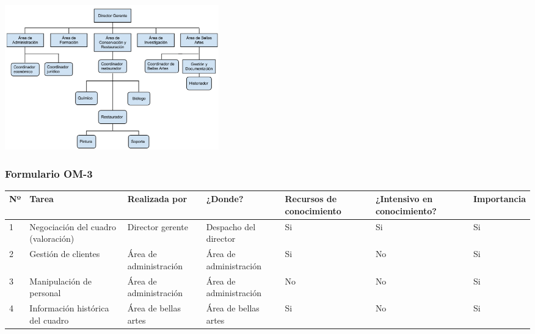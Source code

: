 \documentclass[a4paper,11pt]{article}
\begin{document}
\begin{center}
\begin{tabular}{| p{2.5cm} | p{9cm} |}
					\hline
				\end{tabular}\\
				\newpage
				\includegraphics[width=350px]{organigrama.png} \\
			\end{center}
			\newpage
			\begin{landscape}
			\subsubsection{Formulario OM-3}
			\begin{center}
				\begin{tabular}{| l | p{4cm} | p{2.8cm} | p{2cm} | p{2cm} | p{3cm} |
				p{2.2cm} |}
					\hline
					\textbf{Nº} & \textbf{Tarea} & \textbf{Realizada por} & \textbf{¿Donde?} & \textbf{Recursos de conocimiento} &
					\textbf{¿Intensivo en conocimiento?} & \textbf{Importancia}\\
					\hline
					1 & Negociación del cuadro (valoración) & Director gerente & Despacho del
					director & Si & Si & Si\\
					\hline
					2 & Gestión de clientes & Área de administración & Área de administración
					& Si & No & Si\\
					\hline
					3 & Manipulación de personal & Área de administración & Área de
					administración & No & No & Si\\
					\hline
					4 & Información histórica del cuadro & Área de bellas artes & Área de
					bellas artes & Si & No & Si\\
					\hline
				\end{tabular}
			\end{center}
			\end{landscape}
			\newpage
\end{document}
